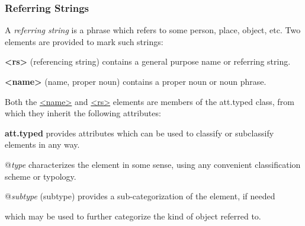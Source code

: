 \subsubsection[{Referring Strings}]{Referring Strings}\label{CONARS}\par
A \textit{referring string} is a phrase which refers to some person, place, object, etc. Two elements are provided to mark such strings: 
\begin{sansreflist}
  
\item [\textbf{<rs>}] (referencing string) contains a general purpose name or referring string.
\item [\textbf{<name>}] (name, proper noun) contains a proper noun or noun phrase.
\end{sansreflist}
 Both the \hyperref[TEI.name]{<name>} and \hyperref[TEI.rs]{<rs>} elements are members of the \textsf{att.typed} class, from which they inherit the following attributes: 
\begin{sansreflist}
  
\item [\textbf{att.typed}] provides attributes which can be used to classify or subclassify elements in any way.\hfil\\[-10pt]\begin{sansreflist}
    \item[@{\itshape type}]
  characterizes the element in some sense, using any convenient classification scheme or typology.
    \item[@{\itshape subtype}]
  (subtype) provides a sub-categorization of the element, if needed
\end{sansreflist}  
\end{sansreflist}
 which may be used to further categorize the kind of object referred to.\par
